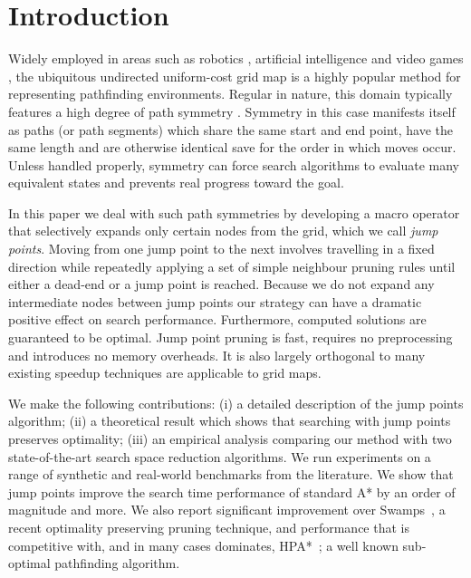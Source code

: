 \section{Introduction}
Widely employed in areas such as robotics \cite{lee09}, artificial intelligence
\cite{wang09} and video games \cite{davis00,sturtevant07}, the ubiquitous
undirected uniform-cost grid map is a highly popular method for representing
pathfinding environments.  Regular in nature, this domain typically features a
high degree of path symmetry \cite{harabor10,pochter10}.  Symmetry in this case
manifests itself as paths (or path segments) which share the same start and end
point, have the same length and are otherwise identical save for the order in
which moves occur.  Unless handled properly, symmetry can force search
algorithms to evaluate many equivalent states and prevents real progress toward
the goal.

In this paper we deal with such path symmetries by developing a macro operator
that selectively expands only certain nodes from the grid, which we call
\emph{jump points}. Moving from one jump point to the next involves travelling
in a fixed direction while repeatedly applying a set of simple neighbour pruning
rules until either a dead-end or a jump point is reached.  Because we do not
expand any intermediate nodes between jump points our strategy can have a
dramatic positive effect on search performance.  Furthermore, computed solutions
are guaranteed to be optimal.  Jump point pruning is fast, requires no
preprocessing and introduces no memory overheads. It is also largely orthogonal to many
existing speedup techniques are applicable to grid maps.

We make the following contributions: (i) a detailed description of the jump
points algorithm; (ii) a theoretical result which shows that searching with jump
points preserves optimality;  (iii) an empirical analysis comparing our method
with two state-of-the-art search space reduction algorithms.  We run experiments
on a range of synthetic and real-world benchmarks from the literature.
We show that jump points improve the search time performance of standard A* by
an order of magnitude and more.  We also report significant improvement over
Swamps~\cite{pochter10}, a recent optimality preserving pruning technique, and
performance that is competitive with, and in many cases dominates,
HPA*~\cite{botea04}; a well known sub-optimal pathfinding algorithm.
